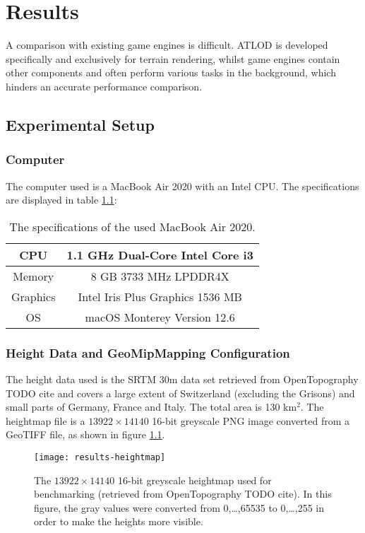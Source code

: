 \chapter{Results}
A comparison with existing game engines is difficult. ATLOD is 
developed specifically and exclusively for terrain rendering, whilst game engines
contain other components and often perform various tasks in the background, which hinders an accurate performance comparison.

\section{Experimental Setup}
\subsection{Computer}
The computer used is a MacBook Air 2020 with an Intel CPU.
The specifications are displayed in table \ref{tbl:specs}:

\begin{table}[H]
  \begin{center}
    \begin{tabular}{ c|c }
      CPU & 1.1 GHz Dual-Core Intel Core i3\\
      \hline
      Memory & 8 GB 3733 MHz LPDDR4X\\
      \hline
      Graphics & Intel Iris Plus Graphics 1536 MB\\
      \hline
      OS & macOS Monterey Version 12.6
    \end{tabular}
  \end{center}
  \caption{The specifications of the used MacBook Air 2020.}\label{tbl:specs}
  \end{table}

\subsection{Height Data and GeoMipMapping Configuration}
The height data used is the SRTM 30m data set retrieved from OpenTopography TODO cite and covers 
a large extent of Switzerland (excluding the Grisons) and small parts 
of Germany, France and Italy. The total area is 130 km$^2$.
The heightmap file
is a $13922 \times 14140$ 16-bit greyscale PNG image converted 
from a GeoTIFF file, as shown in figure \ref{fig:results-heightmap}.

\begin{figure}[H]
  \centering
  \texttt{[image: results-heightmap]}
  \caption{The $13922 \times 14140$ 16-bit greyscale heightmap used for benchmarking (retrieved from OpenTopography TODO cite). In this figure, the gray values were converted from 0,\dots,65535 to 0,\dots,255 in order to make the heights more visible.}\label{fig:results-heightmap}
\end{figure}

